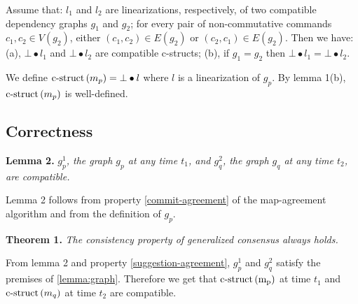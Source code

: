 \begin{mylemma}\label{lemma:graph}
Assume that: $l_1$ and $l_2$ are linearizations, respectively, of two compatible dependency graphs $g_1$ and $g_2$; 
for every pair of non-commutative commands $c_1,c_2 \in V\left(g_2\right)$, either $\left( c_1,c_2 \right)\in E\left( g_2 \right)$ or $\left( c_2,c_1 \right)\in E\left( g_2 \right)$.
Then we have: (a), $\bot\bullet l_1$ and $\bot\bullet l_2$ are compatible c-structs; (b), if $g_1 = g_2$ then $\bot\bullet l_1 = \bot\bullet l_2$.
\end{mylemma}

\begin{mydef}\label{lindef}
We define $\operatorname{c-struct}\left( m_p \right) = \bot\bullet l$ where $l$ is a linearization of $g_p$.
\textnormal{By lemma 1(b), $\operatorname{c-struct}\left( m_p \right)$ is well-defined.}
\end{mydef}


\subsection{Correctness}

\noindent\textbf{Lemma 2.} \emph{$g_p^1$, the graph $g_p$ at any time $t_1$, and $g_q^2$, the graph $g_q$ at any time $t_2$, are compatible. }

Lemma 2 follows from property \ref{commit-agreement} of the map-agreement algorithm and from the definition of $g_p$.

\noindent\textbf{Theorem 1.}
\emph{The consistency property of generalized consensus always holds.}

From lemma 2 and property \ref{suggestion-agreement}, $g_p^1$ and $g_q^2$ satisfy the premises of \cref{lemma:graph}. Therefore we get that $\operatorname{c-struct\left( m_p \right)}$ at time $t_1$ and $\operatorname{c-struct}\left( m_q \right)$ at time $t_2$ are compatible.

